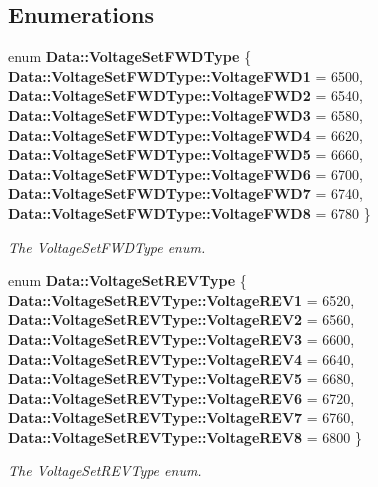 \subsection*{Enumerations}
\begin{DoxyCompactItemize}
\item 
enum \textbf{ Data\+::\+Voltage\+Set\+F\+W\+D\+Type} \{ \newline
\textbf{ Data\+::\+Voltage\+Set\+F\+W\+D\+Type\+::\+Voltage\+F\+W\+D1} = 6500, 
\textbf{ Data\+::\+Voltage\+Set\+F\+W\+D\+Type\+::\+Voltage\+F\+W\+D2} = 6540, 
\textbf{ Data\+::\+Voltage\+Set\+F\+W\+D\+Type\+::\+Voltage\+F\+W\+D3} = 6580, 
\textbf{ Data\+::\+Voltage\+Set\+F\+W\+D\+Type\+::\+Voltage\+F\+W\+D4} = 6620, 
\newline
\textbf{ Data\+::\+Voltage\+Set\+F\+W\+D\+Type\+::\+Voltage\+F\+W\+D5} = 6660, 
\textbf{ Data\+::\+Voltage\+Set\+F\+W\+D\+Type\+::\+Voltage\+F\+W\+D6} = 6700, 
\textbf{ Data\+::\+Voltage\+Set\+F\+W\+D\+Type\+::\+Voltage\+F\+W\+D7} = 6740, 
\textbf{ Data\+::\+Voltage\+Set\+F\+W\+D\+Type\+::\+Voltage\+F\+W\+D8} = 6780
 \}\begin{DoxyCompactList}\small\item\em The Voltage\+Set\+F\+W\+D\+Type enum. \end{DoxyCompactList}
\item 
enum \textbf{ Data\+::\+Voltage\+Set\+R\+E\+V\+Type} \{ \newline
\textbf{ Data\+::\+Voltage\+Set\+R\+E\+V\+Type\+::\+Voltage\+R\+E\+V1} = 6520, 
\textbf{ Data\+::\+Voltage\+Set\+R\+E\+V\+Type\+::\+Voltage\+R\+E\+V2} = 6560, 
\textbf{ Data\+::\+Voltage\+Set\+R\+E\+V\+Type\+::\+Voltage\+R\+E\+V3} = 6600, 
\textbf{ Data\+::\+Voltage\+Set\+R\+E\+V\+Type\+::\+Voltage\+R\+E\+V4} = 6640, 
\newline
\textbf{ Data\+::\+Voltage\+Set\+R\+E\+V\+Type\+::\+Voltage\+R\+E\+V5} = 6680, 
\textbf{ Data\+::\+Voltage\+Set\+R\+E\+V\+Type\+::\+Voltage\+R\+E\+V6} = 6720, 
\textbf{ Data\+::\+Voltage\+Set\+R\+E\+V\+Type\+::\+Voltage\+R\+E\+V7} = 6760, 
\textbf{ Data\+::\+Voltage\+Set\+R\+E\+V\+Type\+::\+Voltage\+R\+E\+V8} = 6800
 \}\begin{DoxyCompactList}\small\item\em The Voltage\+Set\+R\+E\+V\+Type enum. \end{DoxyCompactList}
\end{DoxyCompactItemize}
